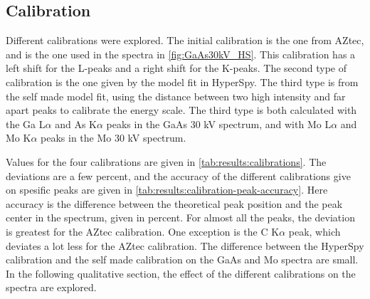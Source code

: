 



\subsection{Calibration}
\label{sec:results:qualitative:calibration}

Different calibrations were explored.
The initial calibration is the one from AZtec, and is the one used in the spectra in \cref{fig:GaAs30kV_HS}.
This calibration has a left shift for the L-peaks and a right shift for the K-peaks.
The second type of calibration is the one given by the model fit in HyperSpy.
The third type is from the self made model fit, using the distance between two high intensity and far apart peaks to calibrate the energy scale.
The third type is both calculated with the Ga L$\alpha$ and As K$\alpha$ peaks in the GaAs 30 kV spectrum, and with Mo L$\alpha$ and Mo K$\alpha$ peaks in the Mo 30 kV spectrum.

Values for the four calibrations are given in \cref{tab:results:calibrations}.
The deviations are a few percent, and the accuracy of the different calibrations give on spesific peaks are given in \cref{tab:results:calibration-peak-accuracy}.
Here accuracy is the difference between the theoretical peak position and the peak center in the spectrum, given in percent.
For almost all the peaks, the deviation is greatest for the AZtec calibration.
One exception is the C K$\alpha$ peak, which deviates a lot less for the AZtec calibration. %
The difference between the HyperSpy calibration and the self made calibration on the GaAs and Mo spectra are small.
In the following qualitative section, the effect of the different calibrations on the spectra are explored.













